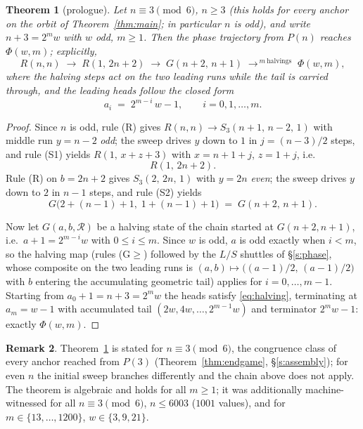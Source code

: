 \documentclass[11pt]{amsart}
\newtheorem{theorem}{Theorem}[section]
\theoremstyle{definition}
\newtheorem{remark}[theorem]{Remark}
\begin{document}
\begin{theorem}[prologue]\label{thm:prologue}
Let $n\equiv3\pmod6$, $n\ge3$ (this holds for every anchor on the orbit of
Theorem~\ref{thm:main}; in particular $n$ is odd), and write
$n+3=2^{m}w$ with $w$ odd, $m\ge1$. Then the phase
trajectory from $P(n)$ reaches $\Phi(w,m)$; explicitly,
\[
R(n,n)\;\to\;R(1,\,2n+2)\;\to\;G(n+2,\,n+1)\;\to^{\,m\ \text{halvings}}\;\Phi(w,m),
\]
where the halving steps act on the two leading runs while the tail is
carried through, and the leading heads follow the closed form
\begin{equation}\label{eq:halving}
a_i \;=\; 2^{m-i}\,w-1,\qquad i=0,1,\dots,m .
\end{equation}
\end{theorem}

\begin{proof}
Since $n$ is odd, rule (R) gives $R(n,n)\to S_3(n+1,\,n-2,\,1)$ with
middle run $y=n-2$ \emph{odd}; the sweep drives $y$ down to $1$ in
$j=(n-3)/2$ steps, and rule (S1) yields $R(1,\,x+z+3)$ with
$x=n+1+j$, $z=1+j$, i.e.\
\[
R(1,\,2n+2).
\]
Rule (R) on $b=2n+2$ gives $S_3(2,\,2n,\,1)$ with $y=2n$ \emph{even}; the
sweep drives $y$ down to $2$ in $n-1$ steps, and rule (S2) yields
\[
G\bigl(2+(n-1)+1,\;1+(n-1)+1\bigr)\;=\;G(n+2,\,n+1).
\]

Now let $G(a,b,\mathcal R)$ be a halving state of the chain started at
$G(n+2,n+1)$, i.e.\ $a+1=2^{m-i}w$ with $0\le i\le m$. Since $w$ is odd,
$a$ is odd exactly when $i<m$, so the halving map (rules (G$\ge$) followed
by the $L/S$ shuttles of \S\ref{s:phase}, whose composite on the two
leading runs is
$(a,b)\mapsto\bigl((a-1)/2,\,(a-1)/2\bigr)$ with $b$ entering the
accumulating geometric tail) applies for $i=0,\dots,m-1$. Starting from
$a_0+1=n+3=2^{m}w$ the heads satisfy \eqref{eq:halving}, terminating at
$a_m=w-1$ with accumulated tail $(2w,4w,\dots,2^{m-1}w)$ and terminator
$2^{m}w-1$: exactly $\Phi(w,m)$.
\end{proof}

\begin{remark}
Theorem~\ref{thm:prologue} is stated for $n\equiv3\pmod6$, the congruence
class of every anchor reached from $P(3)$ (Theorem~\ref{thm:endgame},
\S\ref{s:assembly}); for even $n$ the initial sweep branches differently
and the chain above does not apply. The theorem is algebraic and holds for
all $m\ge1$; it was additionally machine-witnessed for all
$n\equiv3\pmod6$, $n\le6003$ ($1001$ values), and for
$m\in\{13,\dots,1200\}$, $w\in\{3,9,21\}$.
\end{remark}
\end{document}
